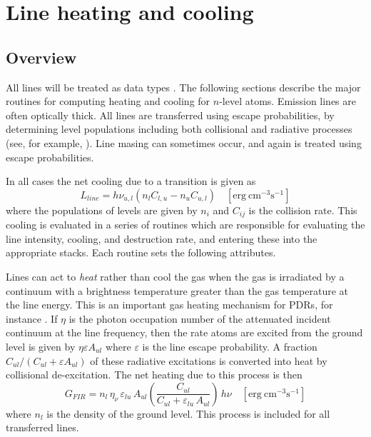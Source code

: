 \section{Line heating and cooling }

\subsection{Overview}

All lines will be treated as data types .  The following sections
describe the major routines for computing heating and cooling for $n$-level
atoms. Emission lines are often optically thick.  All lines are transferred
using escape probabilities, by determining level populations including both
collisional and radiative processes (see, for example, \citealp{Elitzur1992}).  Line
masing can sometimes occur, and again is treated using escape probabilities.

In all cases the net cooling due to a transition is given as
\begin{equation}
{L_{line}} = h{\nu _{u,l}}\left( {{n_l}{C_{l,u}} - {n_u}{C_{u,l}}} \right)
\quad [\mathrm{erg~cm}^{-3} \mathrm{s}^{-1}]
\end{equation}
where the populations of levels are given by $n_i$ and $C_{ij}$ is the collision
rate.  This cooling is evaluated in a series of routines
which are responsible for evaluating the line intensity,
cooling, and destruction rate, and entering these into the appropriate
stacks.  Each routine sets the following attributes.

Lines can act to \emph{heat} rather than cool the gas when the gas is irradiated
by a continuum with a brightness temperature greater than the gas temperature
at the line energy. This is an important gas heating mechanism for PDRs,
for instance \citep{Tielens1985a}.  If $\eta$ is the photon occupation
number of the attenuated incident continuum at the line frequency, then
the rate atoms are excited from the ground level is given by
$\eta\varepsilon A_{ul}$ where
$\varepsilon $ is the line escape probability.  A fraction $C_{ul}/(C_{ul}+
\varepsilon A_{ul})$ of these
radiative excitations is converted into heat by collisional de-excitation.
The net heating due to this process is then
\begin{equation}
{G_{FIR}} = {n_l}\,{\eta _\nu }\,{\varepsilon _{lu}}\,{A_{ul}}\left(
{\frac{{{C_{ul}}}}{{{C_{ul}} + {\varepsilon _{lu}}\,{A_{ul}}}}} \right)\,h\nu
\quad [\mathrm{erg~cm}^{-3} \mathrm{s}^{-1}]
\end{equation}
where $n_l$ is the density of the ground level.  This process is included for
all transferred lines.


